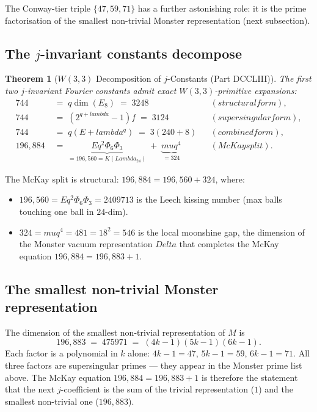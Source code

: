 \documentclass[11pt]{article}
\def\mathbb#1{#1}%
\def\mathbf#1{#1}%
\def\textbf#1{#1}%
\def\text#1{#1}%
\def\Delta{Delta}%
\def\lambda{lambda}%
\def\Lambda{Lambda}%
\def\mu{mu}%
\def\Phi#1{Phi#1}%
\def\cdot{ }%
\newtheorem*{theorem}{Theorem}
\begin{document}
The Conway-tier triple $\{47, 59, 71\}$ has a further astonishing role: it is the prime factorisation of the smallest non-trivial Monster representation (next subsection).

\subsection*{The $j$-invariant constants decompose}

\begin{theorem}[$W(3,3)$ Decomposition of $j$-Constants (Part DCCLIII)]
The first two $j$-invariant Fourier constants admit exact $W(3,3)$-primitive expansions:
\begin{align*}
744 &\;=\; q \cdot \dim(E_8) \;=\; 3 \cdot 248 && \text{(structural form)}, \\
744 &\;=\; (2^{q+\lambda} - 1)\cdot f \;=\; 31 \cdot 24 && \text{(supersingular form)}, \\
744 &\;=\; q \cdot (E + \lambda^q) \;=\; 3 \cdot (240 + 8) && \text{(combined form)}, \\
196{,}884 &\;=\; \underbrace{E \cdot q^2 \cdot \Phi_6 \cdot \Phi_3}_{= 196{,}560 = K(\Lambda_{24})}
\;+\; \underbrace{\mu \cdot q^4}_{= 324} && \text{(McKay split)}.
\end{align*}
\end{theorem}

The McKay split is structural: \textbf{$196{,}884 = 196{,}560 + 324$}, where:
\begin{itemize}[leftmargin=2em]
\item $196{,}560 = E \cdot q^2 \cdot \Phi_6 \cdot \Phi_3 = 240 \cdot 9 \cdot 7 \cdot 13$ is the \textbf{Leech kissing number} (max balls touching one ball in $24$-dim).
\item $324 = \mu \cdot q^4 = 4 \cdot 81 = 18^2 = 54 \cdot 6$ is the \textbf{local moonshine gap}, the dimension of the Monster vacuum representation $\Delta$ that completes the McKay equation $196{,}884 = 196{,}883 + 1$.
\end{itemize}

\subsection*{The smallest non-trivial Monster representation}

The dimension of the smallest non-trivial representation of $\mathbb{M}$ is
\[
\boxed{\;196{,}883 \;=\; 47 \cdot 59 \cdot 71 \;=\; (4k - 1)(5k - 1)(6k - 1).\;}
\]
Each factor is a polynomial in $k$ alone: $4k-1 = 47$, $5k-1 = 59$, $6k-1 = 71$. \textbf{All three factors are supersingular primes} --- they appear in the Monster prime list above. The McKay equation $196{,}884 = 196{,}883 + 1$ is therefore the statement that the next $j$-coefficient is the sum of the trivial representation ($\mathbf{1}$) and the smallest non-trivial one ($\mathbf{196{,}883}$).
\end{document}
